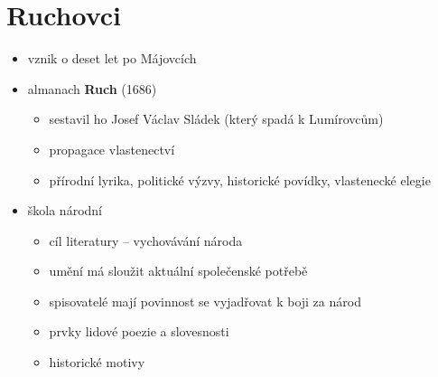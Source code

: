 \section{Ruchovci}
\begin{itemize}
\item vznik o deset let po Májovcích
\item almanach \textbf{Ruch} (1686)
	\begin{itemize}
	\item sestavil ho Josef Václav Sládek (který spadá k Lumírovcům)
	\item propagace vlastenectví
	\item přírodní lyrika, politické výzvy, historické povídky, vlastenecké elegie
	\end{itemize}
\item škola národní
	\begin{itemize}
	\item cíl literatury -- vychovávání národa
	\item umění má sloužit aktuální společenské potřebě
	\item spisovatelé mají povinnost se vyjadřovat k boji za národ
	\item prvky lidové poezie a slovesnosti
	\item historické motivy
	\end{itemize}
\end{itemize}

